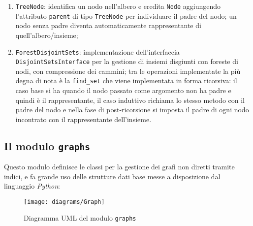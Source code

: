 \begin{enumerate}
      \item \texttt{TreeNode}: identifica un nodo nell'albero e eredita \texttt{Node} aggiungendo l'attributo \texttt{parent} di tipo \texttt{TreeNode}
            per individuare il padre del nodo; un nodo senza padre diventa automaticamente rappresentante di quell'albero/insieme;
      \item \texttt{ForestDisjointSets}: implementazione dell'interfaccia \texttt{DisjointSetsInterface} per la gestione
            di insiemi disgiunti con foreste di nodi, con compressione dei cammini; tra le operazioni implementate la più degna di nota
            è la \texttt{find\_set} che viene implementata in forma ricorsiva: il caso base si ha quando il nodo passato come argomento
            non ha padre e quindi è il rappresentante, il caso induttivo richiama lo stesso metodo con il padre del nodo e nella fase di
            post-ricorsione si imposta il padre di ogni nodo incontrato con il rappresentante dell'insieme.
\end{enumerate}

\subsection{Il modulo \texttt{graphs}}
Questo modulo definisce le classi per la gestione dei grafi non diretti tramite indici, e fa grande uso delle strutture dati
base messe a disposizione dal linguaggio \textit{Python}:

\begin{figure}[!b]
      \centering
      \texttt{[image: diagrams/Graph]}
      \caption{Diagramma UML del modulo \texttt{graphs}}
\end{figure}

